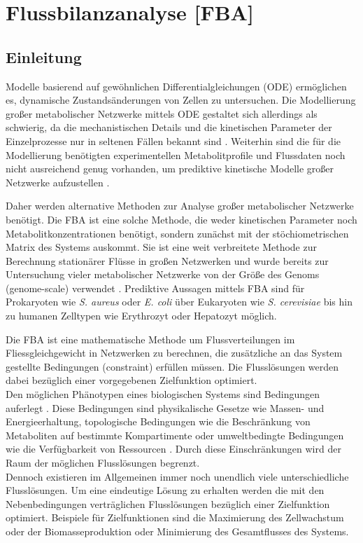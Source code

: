 \chapter{Flussbilanzanalyse [FBA]}
\label{fba}
\section{Einleitung}
Modelle basierend auf gewöhnlichen Differentialgleichungen (ODE) ermöglichen es, dynamische Zustandsänderungen von Zellen zu untersuchen. Die Modellierung großer metabolischer Netzwerke mittels ODE gestaltet sich allerdings als schwierig, da die mechanistischen Details und die kinetischen Parameter der Einzelprozesse nur in seltenen Fällen bekannt sind \cite{Stelling2002}. Weiterhin sind die für die Modellierung benötigten experimentellen Metabolitprofile und Flussdaten noch nicht ausreichend genug vorhanden, um prediktive kinetische Modelle großer Netzwerke aufzustellen \cite{Lee2006}.

Daher werden alternative Methoden zur Analyse großer metabolischer Netzwerke benötigt. Die FBA ist eine solche Methode, die weder kinetischen Parameter noch Metabolitkonzentrationen benötigt, sondern zunächst mit der stöchiometrischen Matrix des Systems auskommt. Sie ist eine weit verbreitete Methode zur Berechnung stationärer Flüsse in großen Netzwerken und wurde bereits zur Untersuchung vieler metabolischer Netzwerke von der Größe des Genoms (genome-scale) verwendet \cite{Duarte2004, Feist2007, Boelling2009}. Prediktive Aussagen mittels FBA sind für Prokaryoten wie \textit{S. aureus} \cite{Heinemann2005} oder \textit{E. coli} \cite{Mahadevan2002} über Eukaryoten wie \textit{S. cerevisiae} \cite{Duarte2004} bis hin zu humanen Zelltypen wie Erythrozyt \cite {Holzhuetter2004} oder Hepatozyt \cite{Boelling2009} möglich.

Die FBA ist eine mathematische Methode um Flussverteilungen im Fliessgleichgewicht in Netzwerken zu berechnen, die zusätzliche an das System gestellte Bedingungen (constraint) erfüllen müssen. Die Flusslösungen werden dabei bezüglich einer vorgegebenen Zielfunktion optimiert.\\
Den möglichen Phänotypen eines biologischen Systems sind Bedingungen auferlegt \cite{Covert2003, Price2004}. Diese Bedingungen sind physikalische Gesetze wie Massen- und Energieerhaltung, topologische Bedingungen wie die Beschränkung von Metaboliten auf bestimmte Kompartimente oder umweltbedingte Bedingungen wie die Verfügbarkeit von Ressourcen \cite{Lee2006}. Durch diese Einschränkungen wird der Raum der möglichen Flusslösungen begrenzt.\\
Dennoch existieren im Allgemeinen immer noch unendlich viele unterschiedliche Flusslösungen. Um eine eindeutige Lösung zu erhalten werden die mit den Nebenbedingungen verträglichen Flusslösungen bezüglich einer Zielfunktion optimiert. Beispiele für Zielfunktionen sind die Maximierung des Zellwachstum oder der Biomasseproduktion oder Minimierung des Gesamtflusses des Systems.

